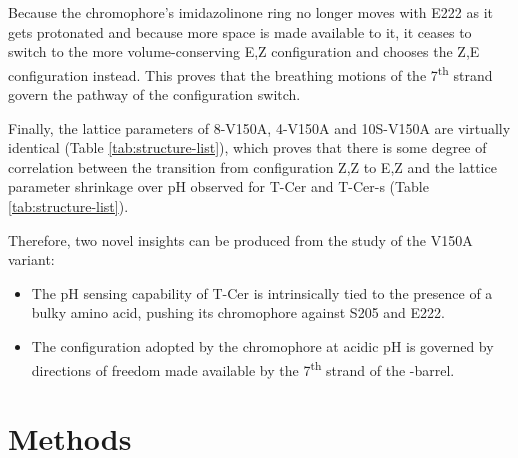 Because the chromophore's imidazolinone ring no longer moves with E222 as it gets protonated and because more space is made available to it, it ceases to switch to the more volume-conserving E,Z configuration and chooses the Z,E configuration instead. This proves that the breathing motions of the 7\textsuperscript{th} strand govern the pathway of the configuration switch. 

\vspace{2mm}

Finally, the lattice parameters of 8-V150A, 4-V150A and 10S-V150A are virtually identical (Table \ref{tab:structure-list}), which proves that there is some degree of correlation between the transition from configuration Z,Z to E,Z and the lattice parameter shrinkage over pH observed for T-Cer and T-Cer-s (Table \ref{tab:structure-list}).

\vspace{2mm}

Therefore, two novel insights can be produced from the study of the V150A variant:
\begin{itemize}
    \item The pH sensing capability of T-Cer is intrinsically tied to the presence of a bulky amino acid, pushing its chromophore against S205 and E222. 
    \item The configuration adopted by the chromophore at acidic pH is governed by directions of freedom made available by the 7\textsuperscript{th} strand of the \textbeta-barrel. 
\end{itemize}



\section{Methods}\label{sec:T-Cer_methods}

